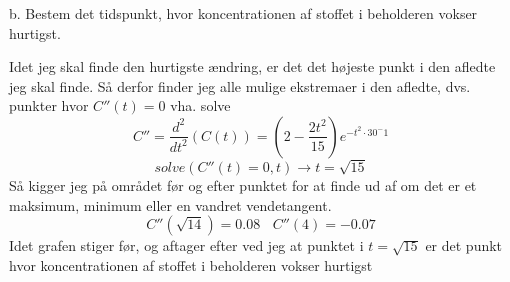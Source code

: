 \documentclass[12pt]{article}
\begin{document}
b. Bestem det tidspunkt, hvor koncentrationen af stoffet i beholderen vokser hurtigst.

Idet jeg skal finde den hurtigste ændring, er det det højeste punkt i den afledte jeg skal finde.
Så derfor finder jeg alle mulige ekstremaer i den afledte, dvs. punkter hvor $C''(t) = 0$ vha. solve
$$C'' = \frac{d^2}{dt^2}(C(t)) = (2-\frac{2t^2}{15})e^{-t^2\cdot 30^-1}$$
$$solve(C''(t) = 0, t) \rightarrow t = \sqrt{15}$$
Så kigger jeg på området før og efter punktet for at finde ud af om det er et maksimum, minimum eller en vandret vendetangent.
$$C''(\sqrt{14}) = 0.08~~~~C''(4) = -0.07$$
Idet grafen stiger før, og aftager efter ved jeg at punktet i $t = \sqrt{15}$ er det punkt hvor koncentrationen af stoffet i beholderen vokser hurtigst
\end{document}
